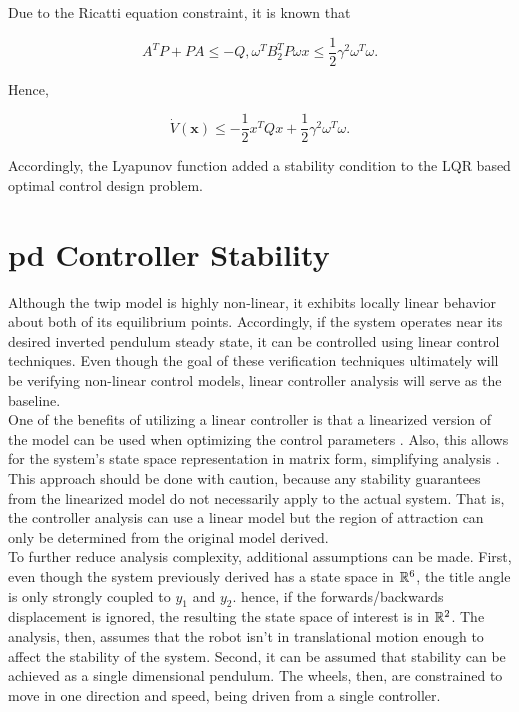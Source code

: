 Due to the Ricatti equation constraint, it is known that

\begin{equation}
    A^T P + PA \le -Q,  \omega^T B_2^T P \omega x \le \frac{1}{2} \gamma^2 \omega^T \omega.
\end{equation}

Hence,

\begin{equation}
    \dot{V}(\bm{x}) \le -\frac{1}{2} x^T Q x + \frac{1}{2} \gamma^2 \omega^T \omega.
\end{equation}

Accordingly, the Lyapunov function added a stability condition to the LQR based optimal control design problem. 

\section{\gls{pd} Controller Stability}

Although the \gls{twip} model is highly non-linear, it exhibits locally linear behavior about both of its equilibrium points. Accordingly, if the system operates near its desired inverted pendulum steady state, it can be controlled using linear control techniques. Even though the goal of these verification techniques ultimately will be verifying non-linear control models, linear controller analysis will serve as the baseline. \\

One of the benefits of utilizing a linear controller is that a linearized version of the model can be used when optimizing the control parameters \cite{grasser2002joe}. Also, this allows for the system's state space representation in matrix form, simplifying analysis \cite{ha1996trajectory}. This approach should be done with caution, because any stability guarantees from the linearized model do not necessarily apply to the actual system. That is, the controller analysis can use a linear model but the region of attraction can only be determined from the original model derived. \\

To further reduce analysis complexity, additional assumptions can be made. First, even though the system previously derived has a state space in $\mathbb{R}^6$, the title angle is only strongly coupled to $y_1$ and $y_2$. hence, if the forwards/backwards displacement is ignored, the resulting the state space of interest is in $\mathbb{R}^2$. The analysis, then, assumes that the robot isn't in translational motion enough to affect the stability of the system. Second, it can be assumed that stability can be achieved as a single dimensional pendulum. The wheels, then, are constrained to move in one direction and speed, being driven from a single controller. \\

